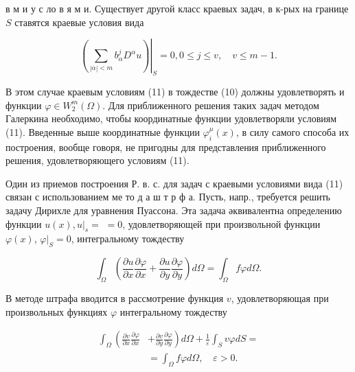 \documentclass[10pt]{article}
\begin{document}
в м и у с ло в я м и. Существует другой класс краевых задач, в к-рых на границе $S$ ставятся краевые условия вида



\[

\left.\left(\sum_{|\alpha|<m} b_{\alpha}^{j} D^{\alpha} u\right)\right|_{S}=0,0 \leqslant j \leqslant v, \quad v \leqslant m-1 .

\]



В этом случае краевым условиям (11) в тождестве (10) должны удовлетворять и функции $\varphi \in W_{2}^{m}(\Omega)$. Для приближенного решения таких задач методом Галеркина необходимо, чтобы координатные функции удовлетворяли условиям (11). Введенные выше координатные функции $\varphi_{i}^{\mu}(x)$, в силу самого способа их построения, вообще говоря, не пригодны для представления приближенного решения, удовлетворяющего условиям (11).



Один из приемов построения Р. в. с. для задач с краевыми условиями вида (11) связан с использованием ме то д а ш т р ф а. Пусть, напр., требуется решить задачу Дирихле для уравнения Пуассона. Эта задача әквивалентна определению функции $u(x),\left.u\right|_{s}=$ $=0$, удовлетворяющей при произвольной функции $\varphi(x)$, $\left.\varphi\right|_{S}=0$, интегральному тождеству



\[

\int_{\Omega}\left(\frac{\partial u}{\partial x} \frac{\partial \varphi}{\partial x}+\frac{\partial u}{\partial y} \frac{\partial \varphi}{\partial y}\right) d \Omega=\int_{\Omega} f \varphi d \Omega .

\]



В методе штрафа вводится в рассмотрение функция $v$, удовлетворяющая при произвольных функциях $\varphi$ интегральному тождеству



\[

\begin{aligned}

\int_{\Omega}\left(\frac{\partial v}{\partial x} \frac{\partial \varphi}{\partial x}\right. & \left.+\frac{\partial v}{\partial y} \frac{\partial \varphi}{\partial y}\right) d \Omega+\frac{1}{\varepsilon} \int_{S} v \varphi d S= \\

& =\int_{\Omega} f \varphi d \Omega, \quad \varepsilon>0 .

\end{aligned}

\]
\end{document}
